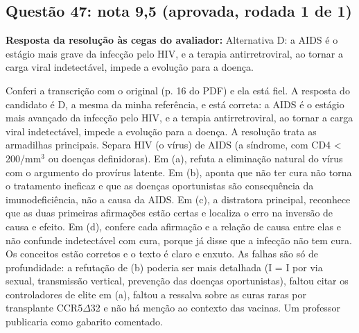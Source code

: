 \documentclass{article}%
\begin{document}
\subsection*{Questão 47: nota 9,5 (aprovada, rodada 1 de 1)}%
\textbf{Resposta da resolução às cegas do avaliador:} Alternativa D: a AIDS é o estágio mais grave da infecção pelo HIV, e a terapia antirretroviral, ao tornar a carga viral indetectável, impede a evolução para a doença.\par %
Conferi a transcrição com o original (p. 16 do PDF) e ela está fiel. A resposta do candidato é D, a mesma da minha referência, e está correta: a AIDS é o estágio mais avançado da infecção pelo HIV, e a terapia antirretroviral, ao tornar a carga viral indetectável, impede a evolução para a doença. A resolução trata as armadilhas principais. Separa HIV (o vírus) de AIDS (a síndrome, com CD4 < 200/mm$^3$ ou doenças definidoras). Em (a), refuta a eliminação natural do vírus com o argumento do provírus latente. Em (b), aponta que não ter cura não torna o tratamento ineficaz e que as doenças oportunistas são consequência da imunodeficiência, não a causa da AIDS. Em (c), a distratora principal, reconhece que as duas primeiras afirmações estão certas e localiza o erro na inversão de causa e efeito. Em (d), confere cada afirmação e a relação de causa entre elas e não confunde indetectável com cura, porque já disse que a infecção não tem cura. Os conceitos estão corretos e o texto é claro e enxuto. As falhas são só de profundidade: a refutação de (b) poderia ser mais detalhada (I = I por via sexual, transmissão vertical, prevenção das doenças oportunistas), faltou citar os controladores de elite em (a), faltou a ressalva sobre as curas raras por transplante CCR5$\Delta$32 e não há menção ao contexto das vacinas. Um professor publicaria como gabarito comentado.%
\end{document}
